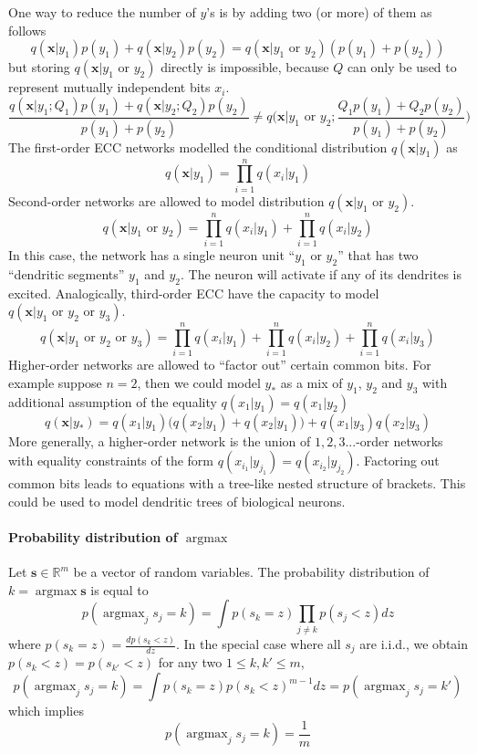 \documentclass[12pt]{article}
\DeclareMathOperator*{\argmax}{argmax}
\begin{document}
One way to reduce the number of $y$'s is by adding two (or more) of them as follows
\[
q(\boldsymbol{x}|y_1) p(y_1)+q(\boldsymbol{x}|y_2) p(y_2) = 
q(\boldsymbol{x}|y_1\text{ or }y_2) (p(y_1)+p(y_2))
\]
but storing $q(\boldsymbol{x}|y_1\text{ or }y_2)$ directly is impossible, because $Q$ can only be used to represent mutually independent bits $x_i$. 
\[
\frac{q(\boldsymbol{x}|y_1;Q_1) p(y_1)+q(\boldsymbol{x}|y_2;Q_2) p(y_2)}{p(y_1)+p(y_2)} \ne 
q\big(\boldsymbol{x}|y_1\text{ or }y_2;\frac{Q_1p(y_1) +Q_2p(y_2)}{p(y_1)+p(y_2)}\big) 
\]
The first-order ECC networks modelled the conditional distribution $q(\boldsymbol{x}|y_1)$ as
\[
q(\boldsymbol{x}|y_1) = \prod_{i=1}^{n}q(x_i|y_1)
\]
Second-order networks are allowed to model distribution $q(\boldsymbol{x}|y_1\text{ or }y_2)$. 
\[
q(\boldsymbol{x}|y_1\text{ or }y_2) = \prod_{i=1}^{n}q(x_i|y_1) + \prod_{i=1}^{n}q(x_i|y_2)
\]
In this case, the network has a single neuron unit ``$y_1\text{ or }y_2$'' that has two ``dendritic segments'' $y_1$ and $y_2$. The neuron will activate if any of its dendrites is excited. Analogically, third-order ECC have the capacity to model $q(\boldsymbol{x}|y_1\text{ or }y_2\text{ or }y_3)$. 
\[
q(\boldsymbol{x}|y_1\text{ or }y_2\text{ or }y_3) = \prod_{i=1}^{n}q(x_i|y_1) + \prod_{i=1}^{n}q(x_i|y_2) + \prod_{i=1}^{n}q(x_i|y_3)
\]
Higher-order networks are allowed to ``factor out'' certain common bits. For example suppose $n=2$, then we could model $y_*$ as a mix of $y_1$, $y_2$ and $y_3$ with additional assumption of the equality $q(x_1|y_1)=q(x_1|y_2)$
\[
q(\boldsymbol{x}|y_*) = q(x_1|y_1)\big(q(x_2|y_1) +q(x_2|y_1)\big) + q(x_1|y_3)q(x_2|y_3)
\]
More generally, a higher-order network is the union of $1,2,3...$-order networks with equality constraints of the form $q(x_{i_1}|y_{j_1})=q(x_{i_2}|y_{j_2})$. Factoring out common bits leads to equations with a tree-like nested structure of brackets. This could be used to model dendritic trees of biological neurons.

\paragraph{Probability distribution of $\argmax$}
Let $\boldsymbol{s} \in \mathbb{R}^m$ be a vector of random variables. The probability distribution of $k = \argmax \boldsymbol{s}$ is equal to
\[
	p(\argmax_j s_j=k) = \int p(s_k=z)\prod_{j\ne k} p(s_j < z) dz 
\]
where $p(s_k=z)=\frac{d p(s_k<z)}{d z}$. In the special case where all $s_j$ are i.i.d., we obtain $p(s_{k}<z)=p(s_{k'}<z)$ for any two $1\le k,k' \le m$,
\[
p(\argmax_j s_j=k) = \int p(s_{k}=z) p(s_{k} < z)^{m-1} dz = p(\argmax_j s_j=k')
\]
which implies
\[
p(\argmax_j s_j=k) = \frac{1}{m}
\]
\end{document}
